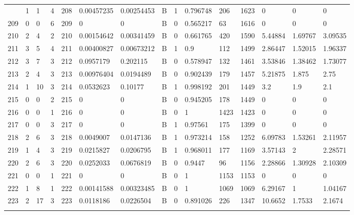 \begin{latin}
\begin{longtable}{lllllllllllllll}
\begin{comment}
	208 & 1  & 1   & 4  & 208 & 0.00457235     & 0.00254453     & B & 1  & 0.796748 & 206  & 1623 & 0       & 0       & 0       \\
	209 & 0  & 0   & 6  & 209 & 0              & 0              & B & 0  & 0.565217 & 63   & 1616 & 0       & 0       & 0       \\
	210 & 2  & 4   & 2  & 210 & 0.00154642     & 0.00341459     & B & 0  & 0.661765 & 420  & 1590 & 5.44884 & 1.69767 & 3.09535 \\
	211 & 3  & 5   & 4  & 211 & 0.00400827     & 0.00673212     & B & 1  & 0.9      & 112  & 1499 & 2.86447 & 1.52015 & 1.96337 \\
	212 & 3  & 7   & 3  & 212 & 0.0957179      & 0.202115       & B & 0  & 0.578947 & 132  & 1461 & 3.53846 & 1.38462 & 1.73077 \\
	213 & 2  & 4   & 3  & 213 & 0.00976404     & 0.0194489      & B & 0  & 0.902439 & 179  & 1457 & 5.21875 & 1.875   & 2.75    \\
	214 & 1  & 10  & 3  & 214 & 0.0532623      & 0.10177        & B & 1  & 0.998192 & 201  & 1449 & 3.2     & 1.9     & 2.1     \\
	215 & 0  & 0   & 2  & 215 & 0              & 0              & B & 0  & 0.945205 & 178  & 1449 & 0       & 0       & 0       \\
	216 & 0  & 0   & 1  & 216 & 0              & 0              & B & 0  & 1        & 1423 & 1423 & 0       & 0       & 0       \\
	217 & 0  & 0   & 3  & 217 & 0              & 0              & B & 1  & 0.97561  & 175  & 1399 & 0       & 0       & 0       \\
	218 & 2  & 6   & 3  & 218 & 0.0049007      & 0.0147136      & B & 1  & 0.973214 & 158  & 1252 & 6.09783 & 1.53261 & 2.11957 \\
	219 & 1  & 4   & 3  & 219 & 0.0215827      & 0.0206795      & B & 1  & 0.968011 & 177  & 1169 & 3.57143 & 2       & 2.28571 \\
	220 & 2  & 6   & 3  & 220 & 0.0252033      & 0.0676819      & B & 0  & 0.9447   & 96   & 1156 & 2.28866 & 1.30928 & 2.10309 \\
	221 & 0  & 0   & 1  & 221 & 0              & 0              & B & 0  & 1        & 1153 & 1153 & 0       & 0       & 0       \\
	222 & 1  & 8   & 1  & 222 & 0.00141588     & 0.00323485     & B & 0  & 1        & 1069 & 1069 & 6.29167 & 1       & 1.04167 \\
	223 & 2  & 17  & 3  & 223 & 0.0118186      & 0.0226504      & B & 0  & 0.891026 & 226  & 1347 & 10.6652 & 1.7533  & 2.1674  \\

\end{comment}
\end{longtable}
\end{latin}
